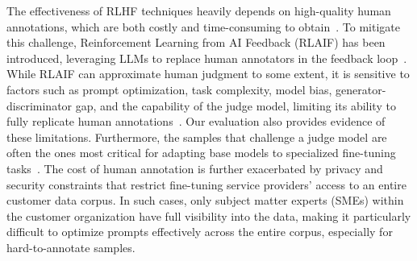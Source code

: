 The effectiveness of RLHF techniques heavily depends on high-quality human annotations, which are both costly and time-consuming to obtain~\cite{pang2023language, lee2023rlaif, wang2024secrets}. To mitigate this challenge, Reinforcement Learning from AI Feedback (RLAIF) has been introduced, leveraging LLMs to replace human annotators in the feedback loop~\cite{lee2023rlaif, leerlaif, bai2022constitutional}. While RLAIF can approximate human judgment to some extent, it is sensitive to factors such as prompt optimization, task complexity, model bias, generator-discriminator gap, and the capability of the judge model, limiting its ability to fully replicate human annotations~\cite{huang2024self, sharma2024critical, lee2023rlaif, zeng2024scaling, huang2023large}. Our evaluation also provides evidence of these limitations. Furthermore, the samples that challenge a judge model are often the ones most critical for adapting base models to specialized fine-tuning tasks~\cite{ethayarajh2024kto, yuan2024self, huang2023large}. The cost of human annotation is further exacerbated by privacy and security constraints that restrict fine-tuning service providers' access to an entire customer data corpus. In such cases, only subject matter experts (SMEs) within the customer organization have full visibility into the data, making it particularly difficult to optimize prompts effectively across the entire corpus, especially for hard-to-annotate samples.


